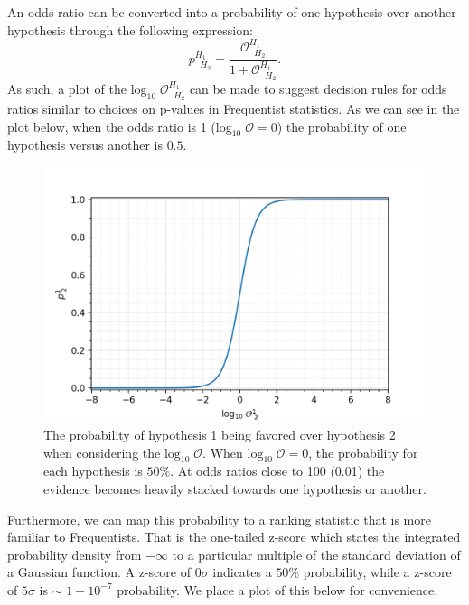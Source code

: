 An odds ratio can be converted into a probability of one hypothesis over another hypothesis through the following expression:
\begin{equation}\label{eqn:probability_odds_ratio}
    p^{H_1 \;\;}_{\;\;H_2} = \frac{\mathcal{O}^{H_1\;\;}_{\;\;H_2}}{1 + \mathcal{O}^{H_1\;\;}_{\;\;H_2}}.
\end{equation}
As such, a plot of the $\mathrm{log}_{10} \; \mathcal{O}^{H_1\;\;}_{\;\;H_2}$ can be made to suggest decision rules for odds ratios similar to choices on p-values in Frequentist statistics. As we can see in the plot below, when the odds ratio is 1 ($\mathrm{log}_{10} \; \mathcal{O} = 0$) the probability of one hypothesis versus another is $0.5$. 
\begin{figure}
  \includegraphics[width=\linewidth]{figs/chapter2/log10odds_probability.png}
  \caption{The probability of hypothesis 1 being favored over hypothesis 2 when considering the $\mathrm{log}_{10} \; \mathcal{O}$. When $\mathrm{log}_{10} \; \mathcal{O} = 0$, the probability for each hypothesis is $50\%$. At odds ratios close to 100 (0.01) the evidence becomes heavily stacked towards one hypothesis or another.}
  \label{fig:log10odds_v_probability}
\end{figure}
Furthermore, we can map this probability to a ranking statistic that is more familiar to Frequentists. That is the one-tailed z-score which states the integrated probability density from $-\infty$ to a particular multiple of the standard deviation of a Gaussian function. A z-score of $0 \sigma$ indicates a $50\%$ probability, while a z-score of $5 \sigma$ is $\sim$ $1-10^{-7}$ probability. We place a plot of this below for convenience.
